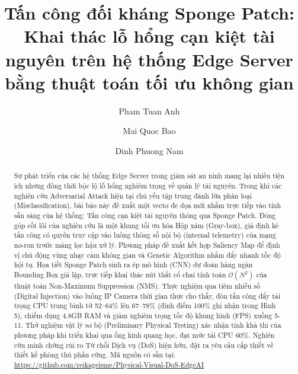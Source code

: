 \documentclass[a4paper,fleqn]{cas-dc}
\begin{document}
\let\WriteBookmarks\relax
\def\floatpagepagefraction{1}
\def\textpagefraction{.001}



\title[mode=title]{Tấn công đối kháng Sponge Patch: Khai thác lỗ hổng cạn kiệt tài nguyên trên hệ thống Edge Server bằng thuật toán tối ưu không gian}

\author[1]{Pham Tuan Anh}

\author[1]{Mai Quoc Bao}

\author[1]{Dinh Phuong Nam}
\cormark[1]



\begin{abstract}
Sự phát triển của các hệ thống Edge Server trong giám sát an ninh mang
lại nhiều tiện ích nhưng đồng thời bộc lộ lỗ hổng nghiêm trọng về quản
lý tài nguyên. Trong khi các nghiên cứu Adversarial Attack hiện tại chủ
yếu tập trung đánh lừa phân loại (Misclassification), bài báo này đề
xuất một vectơ đe dọa mới nhắm trực tiếp vào tính sẵn sàng của hệ thống:
Tấn công cạn kiệt tài nguyên thông qua Sponge Patch. Đóng góp cốt lõi
của nghiên cứu là một khung tối ưu hóa Hộp xám (Gray-box), giả định kẻ
tấn công có quyền truy cập vào luồng thông số nội bộ (internal
telemetry) của mạng nơ-ron trước màng lọc hậu xử lý. Phương pháp đề xuất
kết hợp Saliency Map để định vị chủ động vùng nhạy cảm không gian và
Genetic Algorithm nhằm đẩy nhanh tốc độ hội tụ. Họa tiết Sponge Patch
sinh ra ép mô hình (CNN) dự đoán hàng ngàn Bounding Box giả lập, trực
tiếp khai thác nút thắt cổ chai tính toán
\(\mathcal{O}\left( N^{2} \right)\) của thuật toán Non-Maximum
Suppression (NMS). Thực nghiệm qua tiêm nhiễu số (Digital Injection) vào
luồng IP Camera thời gian thực cho thấy, đòn tấn công đẩy tải trọng CPU
trung bình từ 52--64\% lên 67--78\% (đỉnh điểm 100\% ghi nhận trong Hình
5), chiếm dụng 4.8GB RAM và giảm nghiêm trọng tốc độ khung hình (FPS)
xuống 5-11. Thử nghiệm vật lý sơ bộ (Preliminary Physical Testing) xác
nhận tính khả thi của phương pháp khi triển khai qua ống kính quang học,
đạt mức tải CPU 60\%. Nghiên cứu minh chứng rủi ro Từ chối Dịch vụ (DoS)
hiện hữu, đặt ra yêu cầu cấp thiết về thiết kế phòng thủ phần cứng. Mã
nguồn có sẵn tại:
\url{https://github.com/reikageisme/Physical-Visual-DoS-EdgeAI}
\end{abstract}
\end{document}
